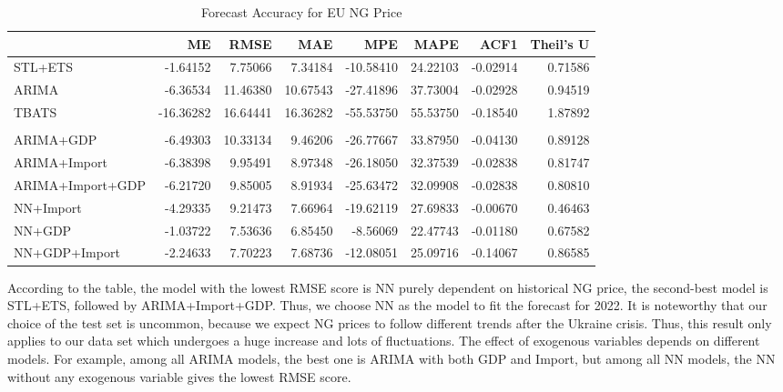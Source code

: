 \documentclass[
]{article}
\begin{document}
\begin{table}[!h]

\caption{\label{tab:unnamed-chunk-31}Forecast Accuracy for EU NG Price}
\centering
\begin{tabular}[t]{l|r|r|r|r|r|r|r}
\hline
  & ME & RMSE & MAE & MPE & MAPE & ACF1 & Theil's U\\
\hline
STL+ETS & -1.64152 & 7.75066 & 7.34184 & -10.58410 & 24.22103 & -0.02914 & 0.71586\\
\hline
ARIMA & -6.36534 & 11.46380 & 10.67543 & -27.41896 & 37.73004 & -0.02928 & 0.94519\\
\hline
TBATS & -16.36282 & 16.64441 & 16.36282 & -55.53750 & 55.53750 & -0.18540 & 1.87892\\
\hline
\cellcolor{gray!6}{NN} & \cellcolor{gray!6}{-1.29305} & \cellcolor{gray!6}{7.45635} & \cellcolor{gray!6}{7.09378} & \cellcolor{gray!6}{-9.25529} & \cellcolor{gray!6}{23.13244} & \cellcolor{gray!6}{-0.04028} & \cellcolor{gray!6}{0.72407}\\
\hline
ARIMA+GDP & -6.49303 & 10.33134 & 9.46206 & -26.77667 & 33.87950 & -0.04130 & 0.89128\\
\hline
ARIMA+Import & -6.38398 & 9.95491 & 8.97348 & -26.18050 & 32.37539 & -0.02838 & 0.81747\\
\hline
ARIMA+Import+GDP & -6.21720 & 9.85005 & 8.91934 & -25.63472 & 32.09908 & -0.02838 & 0.80810\\
\hline
NN+Import & -4.29335 & 9.21473 & 7.66964 & -19.62119 & 27.69833 & -0.00670 & 0.46463\\
\hline
NN+GDP & -1.03722 & 7.53636 & 6.85450 & -8.56069 & 22.47743 & -0.01180 & 0.67582\\
\hline
NN+GDP+Import & -2.24633 & 7.70223 & 7.68736 & -12.08051 & 25.09716 & -0.14067 & 0.86585\\
\hline
\end{tabular}
\end{table}

According to the table, the model with the lowest RMSE score is NN
purely dependent on historical NG price, the second-best model is
STL+ETS, followed by ARIMA+Import+GDP. Thus, we choose NN as the model
to fit the forecast for 2022. It is noteworthy that our choice of the
test set is uncommon, because we expect NG prices to follow different
trends after the Ukraine crisis. Thus, this result only applies to our
data set which undergoes a huge increase and lots of fluctuations. The
effect of exogenous variables depends on different models. For example,
among all ARIMA models, the best one is ARIMA with both GDP and Import,
but among all NN models, the NN without any exogenous variable gives the
lowest RMSE score.
\end{document}

